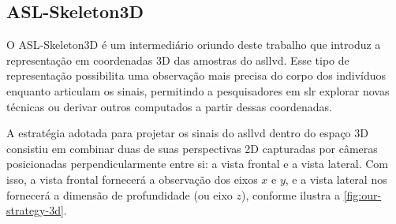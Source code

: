 \subsection{ASL-Skeleton3D}
\label{sec:metodologia-datasets-3d}

O ASL-Skeleton3D é um \dataset intermediário oriundo deste trabalho que introduz a representação em coordenadas 3D das amostras do \acrshort{asllvd}. Esse tipo de representação possibilita uma observação mais precisa do corpo dos indivíduos enquanto articulam os sinais, permitindo a pesquisadores em \acrshort{slr} explorar novas técnicas ou derivar outros \datasets computados a partir dessas coordenadas.

A estratégia adotada para projetar os sinais do \acrshort{asllvd} dentro do espaço 3D consistiu em combinar duas de suas perspectivas 2D capturadas por câmeras posicionadas perpendicularmente entre si: a vista frontal e a vista lateral. Com isso, a vista frontal fornecerá a observação dos eixos \(x\) e \(y\), e a vista lateral nos fornecerá a dimensão de profundidade (ou eixo \( z\)), conforme ilustra a \autoref{fig:our-strategy-3d}.

